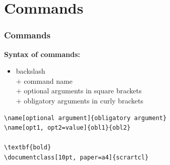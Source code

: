 \section{Commands}

\begin{frame}[fragile]
\frametitle{Commands}

\textbf{Syntax of commands:}

\begin{itemize}
	
	\item backslash \\
	$+$ command name \\
	$+$ optional arguments in square brackets \\
	$+$ obligatory arguments in curly brackets

\end{itemize}
		
\begin{lstlisting}
\name[optional argument]{obligatory argument} 
\name[opt1, opt2=value]{obl1}{obl2}

\textbf{bold}
\documentclass[10pt, paper=a4]{scrartcl}
\end{lstlisting}

\end{frame}



